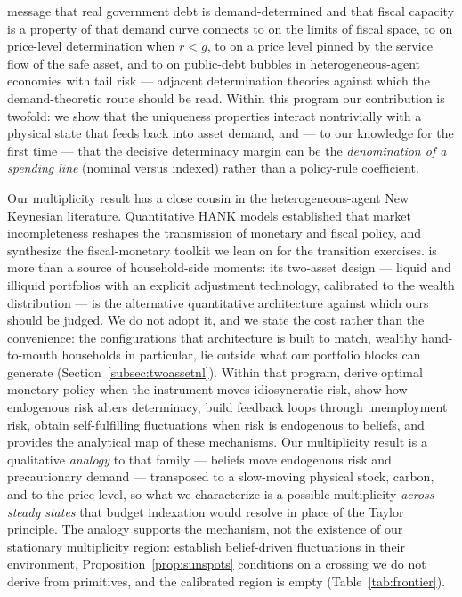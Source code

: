 \documentclass[12pt]{article}
\begin{document}
message that real government debt is demand-determined and that fiscal
capacity is a property of that demand curve connects to
\citet{mianstraubsufi2022} on the limits of fiscal space, to
\citet{bassettocui2018} on price-level determination when $r<g$, to
\citet{brunnermeier2024} on a price level pinned by the service flow of the
safe asset, and to \citet{kocherlakota2023} on public-debt bubbles in
heterogeneous-agent economies with tail risk --- adjacent determination
theories against which the demand-theoretic route should be read. Within
this program our contribution is twofold: we show that the uniqueness
properties interact nontrivially with a physical state that feeds back into
asset demand, and --- to our knowledge for the first time --- that the
decisive determinacy margin can be the \emph{denomination of a spending
line} (nominal versus indexed) rather than a policy-rule coefficient.

Our multiplicity result has a close cousin in the heterogeneous-agent New
Keynesian literature. Quantitative HANK models \citep{kaplan2018,auclert2021}
established that market incompleteness reshapes the transmission of monetary and
fiscal policy, and \citet{auclertrognliestraub2025} synthesize the
fiscal-monetary toolkit we lean on for the transition exercises.
\citet{kaplan2018} is more than a source of household-side moments: its
two-asset design --- liquid and illiquid portfolios with an explicit
adjustment technology, calibrated to the wealth distribution --- is the
alternative quantitative architecture against which ours should be judged. We
do not adopt it, and we state the cost rather than the convenience: the
configurations that architecture is built to match, wealthy hand-to-mouth
households in particular, lie outside what our portfolio blocks can generate
(Section~\ref{subsec:twoassetnl}). Within that
program, \citet{acharya2023optimal} derive optimal monetary policy when the
instrument moves idiosyncratic risk, \citet{acharyadogra2020} show how
endogenous risk alters determinacy, \citet{ravnsterk2021} build feedback loops
through unemployment risk, \citet{acharyabenhabib2024} obtain self-fulfilling
fluctuations when risk is endogenous to beliefs, and \citet{bilbiie2024}
provides the analytical map of these mechanisms. Our multiplicity result is a
qualitative \emph{analogy} to that family --- beliefs move endogenous risk and
precautionary demand --- transposed to a slow-moving physical stock, carbon,
and to the price level, so what we characterize is a possible multiplicity
\emph{across steady states} that budget indexation would resolve in place of
the Taylor principle. The analogy supports the mechanism, not the existence of
our stationary multiplicity region: \citet{acharyabenhabib2024} establish
belief-driven fluctuations in their environment,
Proposition~\ref{prop:sunspots} conditions on a crossing we do not derive from
primitives, and the calibrated region is empty (Table~\ref{tab:frontier}).
\end{document}
